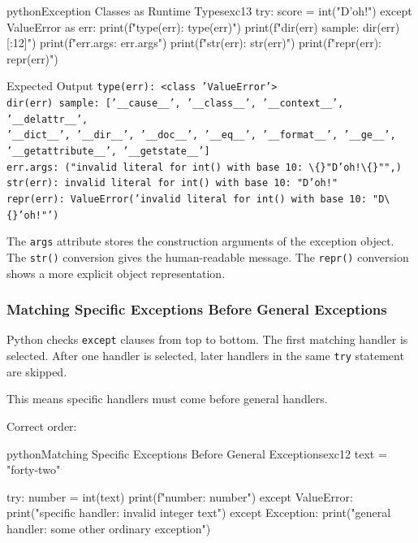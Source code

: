 \documentclass[a4paper,twoside]{report}
\begin{document}
\begin{codebox}[]{python}{Exception Classes as Runtime Types}{exc13}
try:
    score = int("D'oh!")
except ValueError as err:
    print(f"type(err): {type(err)}")
    print(f"dir(err) sample: {dir(err)[:12]}")
    print(f"err.args: {err.args}")
    print(f"str(err): {str(err)}")
    print(f"repr(err): {repr(err)}")
\end{codebox}


\begin{iobox}{Expected Output}
\texttt{type(err): <class 'ValueError'>} \\
\texttt{dir(err) sample: ['\_\_cause\_\_', '\_\_class\_\_', '\_\_context\_\_', '\_\_delattr\_\_',} \\
\texttt{'\_\_dict\_\_', '\_\_dir\_\_', '\_\_doc\_\_', '\_\_eq\_\_', '\_\_format\_\_', '\_\_ge\_\_',} \\
\texttt{'\_\_getattribute\_\_', '\_\_getstate\_\_']} \\
\texttt{err.args: ("invalid literal for int() with base 10: \textbackslash\{\}"D'oh!\textbackslash\{\}"",)} \\
\texttt{str(err): invalid literal for int() with base 10: "D'oh!"} \\
\texttt{repr(err): ValueError('invalid literal for int() with base 10: "D\textbackslash\{\}'oh!"')} \\
\end{iobox}


The \texttt{args} attribute stores the construction arguments of the exception object. The \texttt{str()} conversion gives the human-readable message. The \texttt{repr()} conversion shows a more explicit object representation.

\subsubsection{Matching Specific Exceptions Before General Exceptions}

Python checks \texttt{except} clauses from top to bottom. The first matching handler is selected. After one handler is selected, later handlers in the same \texttt{try} statement are skipped.

This means specific handlers must come before general handlers.

Correct order:

\begin{codebox}[]{python}{Matching Specific Exceptions Before General Exceptions}{exc12}
text = "forty-two"

try:
    number = int(text)
    print(f"number: {number}")
except ValueError:
    print("specific handler: invalid integer text")
except Exception:
    print("general handler: some other ordinary exception")
\end{codebox}
\end{document}
